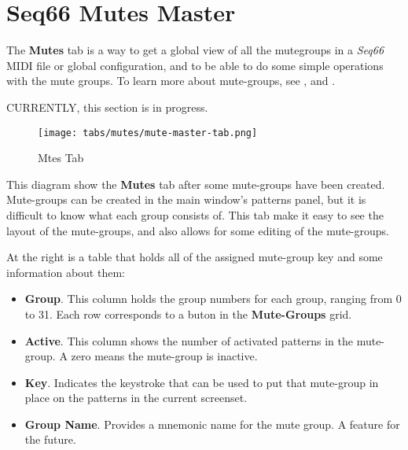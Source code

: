 %
%
%

\section{Seq66 Mutes Master}
\label{sec:mutes}

   The \textbf{Mutes} tab is a way to get a global view of all the mutegroups in
   a \textsl{Seq66} MIDI file or global configuration, and to be able to do
   some simple operations with the mute groups.
   To learn more about mute-groups, see
   , and
   .

   CURRENTLY, this section is in progress.

\begin{figure}[H]
   \centering 
   \texttt{[image: tabs/mutes/mute-master-tab.png]}
   \caption{Mtes Tab}
   \label{fig:mutes_master_tab}
\end{figure}

   This diagram show the \textbf{Mutes} tab after some mute-groups have been
   created.  Mute-groups can be created in the main window's patterns panel, but
   it is difficult to know what each group consists of.  This tab make it easy to
   see the layout of the mute-groups, and also allows for some editing of the
   mute-groups.

   \setcounter{ItemCounter}{0}      %

   At the right is a table that holds all of the assigned mute-group key and some
   information about them:

      \begin{itemize}
         \item \textbf{Group}.
            This column holds the group numbers for each group, ranging from 0 to
            31.  Each row corresponds to a buton in the \textbf{Mute-Groups} grid.
         \item \textbf{Active}.
            This column shows the number of activated patterns in the mute-group.
            A zero means the mute-group is inactive.
         \item \textbf{Key}.
            Indicates the keystroke that can be used to put that mute-group in
            place on the patterns in the current screenset.
         \item \textbf{Group Name}.
            Provides a mnemonic name for the mute group.  A feature for the
            future.
      \end{itemize}

